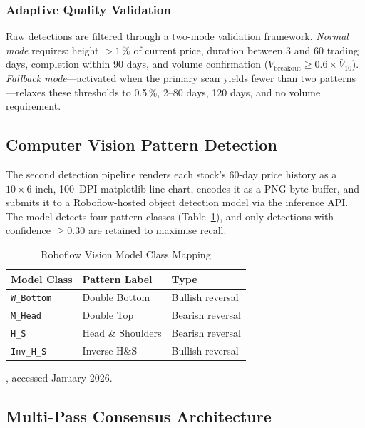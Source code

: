 \documentclass[ASNA,twocolumn]{USG}
\begin{document}
\subsubsection{Adaptive Quality Validation}

Raw detections are filtered through a two-mode validation framework.
\emph{Normal mode} requires: height $> 1\,\%$ of current price, duration
between 3 and 60 trading days, completion within 90 days, and volume
confirmation ($V_\text{breakout} \geq 0.6 \times \bar{V}_{10}$).
\emph{Fallback mode}---activated when the primary scan yields fewer than
two patterns---relaxes these thresholds to 0.5\,\%, 2--80 days, 120 days,
and no volume requirement.

\subsection{Computer Vision Pattern Detection}

The second detection pipeline renders each stock's 60-day price history
as a $10 \times 6$ inch, 100~DPI matplotlib line chart, encodes it as a
PNG byte buffer, and submits it to a Roboflow-hosted object detection
model via the inference API. The model detects four pattern classes
(Table~\ref{tab:roboflow}), and only detections with confidence
$\geq 0.30$ are retained to maximise recall.

\begin{table}[!t]
\caption{Roboflow Vision Model Class Mapping\label{tab:roboflow}}
\begin{tabular*}{\columnwidth}{@{\extracolsep\fill}lll@{\extracolsep\fill}}
\toprule
\textbf{Model Class} & \textbf{Pattern Label} & \textbf{Type} \\
\midrule
\texttt{W\_Bottom} & Double Bottom & Bullish reversal \\
\texttt{M\_Head}   & Double Top    & Bearish reversal \\
\texttt{H\_S}      & Head \& Shoulders & Bearish reversal \\
\texttt{Inv\_H\_S} & Inverse H\&S  & Bullish reversal \\
\bottomrule
\end{tabular*}
\begin{tablenotes}
\item[\textit{Source:}] \citet{roboflow2023}, accessed January 2026.
\end{tablenotes}
\end{table}

\subsection{Multi-Pass Consensus Architecture}
\end{document}
